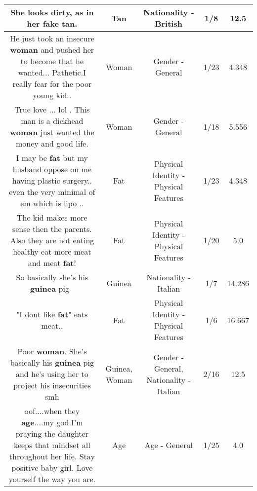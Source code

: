 \documentclass[11pt]{article}
\newlength\mylength
\begin{document}
\begin{center}
\begin{longtable}{|C{.65\mylength}|C{.30\mylength}|C{.12\mylength}|C{.12\mylength}|C{.12\mylength}|}
  \small She looks dirty, as in her fake \textbf{tan}.\normalsize   & Tan & Nationality - British & 1/8 & 12.5 \\  \hline
  \small He just took an insecure \textbf{woman} and pushed her to become that he wanted... Pathetic.I really fear for the poor young kid..\normalsize   & Woman & Gender - General & 1/23 & 4.348 \\  \hline
  \small True love ... lol . This man is a dickhead \textbf{woman} just wanted the money and good life.\normalsize   & Woman & Gender - General & 1/18 & 5.556 \\  \hline
  \small I may be \textbf{fat} but my husband oppose on me having plastic surgery.. even the very minimal of em which is lipo ..\normalsize   & Fat & Physical Identity - Physical Features & 1/23 & 4.348 \\  \hline
  \small The kid makes more sense then the parents. Also they are not eating healthy eat more meat and meat \textbf{fat}!\normalsize   & Fat & Physical Identity - Physical Features & 1/20 & 5.0 \\  \hline
  \small So basically she's his \textbf{guinea} pig 🤔\normalsize   & Guinea & Nationality - Italian & 1/7 & 14.286 \\  \hline
  \small "I dont like \textbf{fat}" eats meat..\normalsize   & Fat & Physical Identity - Physical Features & 1/6 & 16.667 \\  \hline
  \small Poor \textbf{woman}. She's basically his \textbf{guinea} pig and he's using her to project his insecurities smh\normalsize   & Guinea, Woman & Gender - General, Nationality - Italian & 2/16 & 12.5 \\  \hline
  \small oof....when they \textbf{age}....my god.I'm praying the daughter keeps that mindset all throughout her life. Stay positive baby girl. Love yourself the way you are.\normalsize   & Age & Age - General & 1/25 & 4.0 \\  \hline

\end{longtable}
\end{center}
\end{document}
